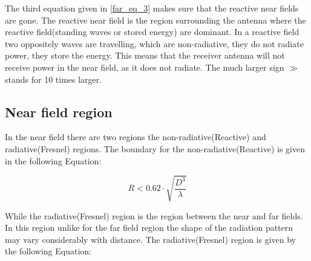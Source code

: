 
The third equation given in \ref{far_eq_3} makes sure that the reactive near fields are gone. The reactive near field is the region surrounding the antenna where the reactive field(standing waves or stored energy) are dominant. In a reactive field two oppositely waves are travelling, which are non-radiative, they do not radiate power, they store the energy. This means that the receiver antenna will not receive power in the near field, as it does not radiate. %
The much larger sign $\gg$ stands for 10 times larger. 













\subsection{Near field region}

In the near field there are two regions the non-radiative(Reactive) and radiative(Fresnel) regions. The boundary for the non-radiative(Reactive) is given in the following Equation:

\begin{equation}
R < 0.62 \cdot \sqrt{\frac{D^{3}}{\lambda}}
\label{near_field_eq}
\end{equation}


While the radiative(Fresnel) region is the region between the near and far fields. In this region unlike for the far field region the shape of the radiation pattern may vary considerably with distance. The radiative(Fresnel) region is given by the following Equation:


